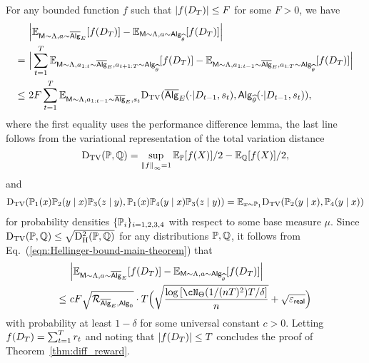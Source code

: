 For any bounded function $f$ such that $|f(\dset_\totlen)|\leq F$ for some $F>0$,  we have
\begin{align*}
  &~ \Big| \E_{\inst\sim\prior,\action\sim\osAlg_\shortexp}[f(\dset_\totlen)]-
   \E_{\inst\sim\prior,\action\sim\sAlg_\EstPar}[f(\dset_\totlen)]\Big|
   \\
   =&~
\Big| \sum_{t=1}^\totlen\E_{\inst\sim\prior,\action_{1:t}\sim\osAlg_\shortexp,\action_{t+1:\totlen}\sim\sAlg_\EstPar}[f(\dset_\totlen)]-
\E_{\inst\sim\prior,\action_{1:t-1}\sim\osAlg_{\shortexp},\action_{t:\totlen}\sim\sAlg_\EstPar}[f(\dset_\totlen)]\Big|
   \\
\leq&~
2F\sum_{t=1}^\totlen\E_{\inst\sim\prior,\action_{1:t-1}\sim\osAlg_{\shortexp},\state_t}\VarD(\osAlg_{\shortexp}(\cdot|\dset_{t-1},\state_t),\sAlg_{\EstPar}(\cdot|\dset_{t-1},\state_t)),
\end{align*}
where the first equality uses the performance difference lemma, the last line follows from the variational representation of the total variation distance $$\VarD(\sP,\sQ)=\sup_{\linf{f}=1}\E_\sP[f(X)]/2-\E_\sQ[f(X)]/2,$$  and \begin{align}
\VarD(\sP_1(x)\sP_2(y\mid x)\sP_3(z\mid y),\sP_1(x)\sP_{4}(y\mid x)\sP_3(z\mid y))=\E_{x\sim\sP_1}\VarD(\sP_2(y\mid x),\sP_{4}(y\mid x))\label{eq:kl_telescope}
\end{align} 
for probability densities $\{ \P_i\}_{i=1,2,3,4}$ with respect to some base measure $\mu$. Since $\VarD(\P,\Q)\leq\sqrt{\HelDs(\P,\Q)}$ for any distributions $\P,\Q$,  it follows from Eq.~(\ref{eqn:Hellinger-bound-main-theorem}) that
\begin{align*}
 &~ \Big| \E_{\inst\sim\prior,\action\sim\osAlg_{\shortexp}}[f(\dset_\totlen)]-
   \E_{\inst\sim\prior,\action\sim\sAlg_\EstPar}[f(\dset_\totlen)]\Big|\\
  \leq &~cF\sqrt{\distratio_{\osAlg_{\shortexp},\sAlg_0}}\cdot\totlen\Big(\sqrt{\frac{\log \brac{ \cN_{\Parspace}(1/(\Numobs\totlen)^2) \totlen/\delta } }{n}} + \sqrt{\geneps}\Big)
\end{align*}
with probability at least $1-\delta$ for some universal constant $c>0$. Letting $f(\dset_\totlen)=\sum_{t=1}^\totlen\reward_t$  and noting that  $|f(\dset_\totlen)|\leq\totlen$ concludes the proof of Theorem~\ref{thm:diff_reward}.









